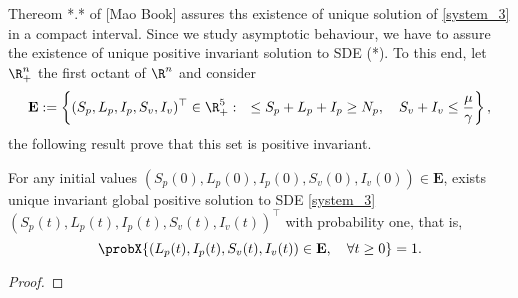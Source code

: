 Thereom *.* of [Mao Book] assures ths existence of unique solution of \eqref{system_3} 
in a compact interval. Since we study asymptotic behaviour, we have to assure the existence of 
unique positive invariant solution to SDE (*). To this end, let $\R^n_+$ the first octant of $\R ^ n$ and consider  
$$	{
	\mathbf{E}:= 
		\left \{ 
			(S_p, L_p, I_p, S_v, I_v)^{\top} \in \R^5_+: \quad
			\leq S_p + L_p + I_p \geq N_p, \quad
			S_v + I_v \leq \frac{\mu}{\gamma}
		\right \},
	}
$$
the following result prove that this set is positive invariant.

\begin{theorem}\label{existence-unique}
	For any initial values 
	$
		(S_p(0), L_p(0), I_p(0), S_v(0), I_v(0)) 
		\in \mathbf{E}
	$, 
	 exists unique invariant global positive solution to SDE \eqref{system_3}
	$
	 	(S_p(t), L_p(t), I_p(t) ,S_v(t), I_v(t)) ^{\top}
	$ with probability one, that is,
	\begin{equation*}
		\probX{
			(L_p(t), I_p(t), S_v(t), I_v(t)) 
			\in 
			\mathbf{E}, \quad
			\forall t \geq 0
		} = 1.
	\end{equation*}
\end{theorem}
\begin{proof}
%	
\end{proof}